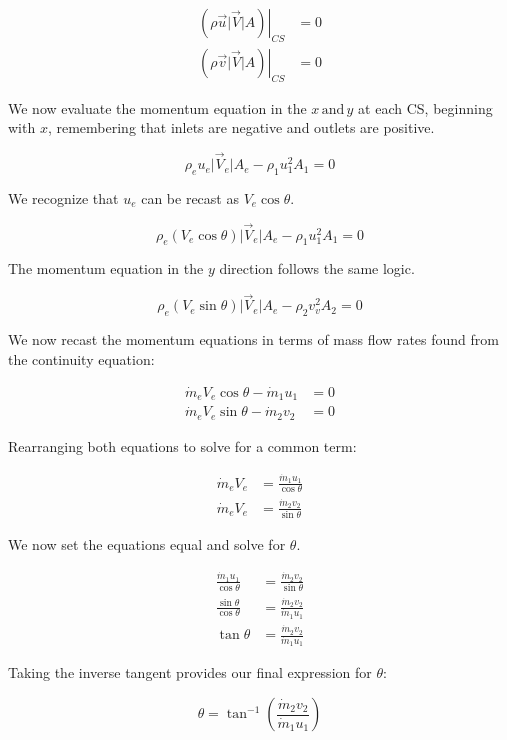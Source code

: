\documentclass[../main.tex]{subfiles}
\begin{document}
\begin{align*}
    \left. \left( \rho \vec{u} \lvert\vec{V}\rvert A \right) \right|_{CS} &=%
    0\\
    \left. \left( \rho \vec{v} \lvert\vec{V}\rvert A \right) \right|_{CS} &=%
    0
\end{align*}

We now evaluate the momentum equation in the \(x \, \textrm{and} \, y\) at each CS, beginning with \(x\), remembering that inlets are negative and outlets are positive.

\[
  \rho_e u_e \lvert\vec{V}_e\rvert A_e - \rho_1 u_1^2 A_1 = 0
\]

We recognize that \(u_e\) can be recast as \(V_e \cos \theta\).

\[
  \rho_e \left({V_e \cos \theta}\right) \lvert\vec{V}_e\rvert A_e - \rho_1 u_1^2 A_1 = 0
\]

The momentum equation in the \(y\) direction follows the same logic.

\[
    \rho_e \left({V_e \sin \theta}\right) \lvert\vec{V}_e\rvert A_e - \rho_2 v_v^2 A_2 = 0
\]


We now recast the momentum equations in terms of mass flow rates found from the continuity equation:

\begin{align*}
    \dot{m}_e V_e \cos \theta - \dot{m}_1 u_1 &= 0\\
    \dot{m}_e V_e \sin \theta - \dot{m}_2 v_2 &= 0
\end{align*}

Rearranging both equations to solve for a common term:

\begin{align*}
    \dot{m}_e V_e &= \frac{\dot{m}_1 u_1}{\cos \theta} \\
    \dot{m}_e V_e &= \frac{\dot{m}_2 v_2}{\sin \theta } 
\end{align*}

We now set the equations equal and solve for \(\theta\).

\begin{align*}
    \frac{\dot{m}_1 u_1}{\cos \theta} &=
    \frac{\dot{m}_2 v_2}{\sin \theta} \\
    \frac{\sin \theta}{\cos \theta} &=
    \frac{\dot{m}_2 v_2}{\dot{m}_1 u_1}\\
    \tan \theta &=
    \frac{\dot{m}_2 v_2}{\dot{m}_1 u_1}
\end{align*}

Taking the inverse tangent provides our final expression for \(\theta\):

\[
    \boxed{
    \theta = \tan^{-1}\left({\frac{\dot{m}_2 v_2}{\dot{m}_1 u_1}}\right)
    }
\]
\end{document}

